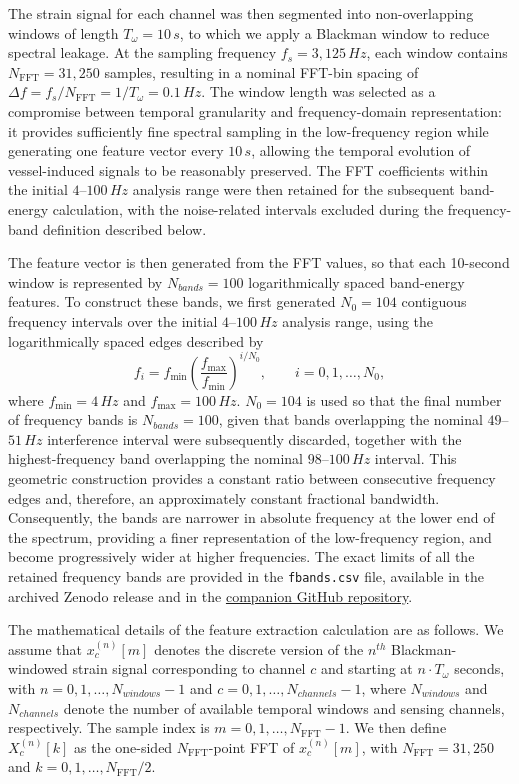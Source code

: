 \documentclass[11pt]{article}
\begin{document}
The strain signal for each channel was then segmented into non-overlapping windows of length $T_\omega=10\,s$, to which we apply a Blackman window to reduce spectral leakage. At the sampling frequency $f_s=3{,}125\,Hz$, each window contains $N_{\mathrm{FFT}}=31{,}250$ samples, resulting in a nominal FFT-bin spacing of
$\Delta f=f_s/N_{\mathrm{FFT}}=1/T_\omega=0.1\,Hz$.
The window length was selected as a compromise between temporal granularity and frequency-domain representation: it provides sufficiently fine spectral sampling in the low-frequency region while generating one feature vector every $10\,s$, allowing the temporal evolution of vessel-induced signals to be reasonably preserved. The FFT coefficients within the initial $4$--$100\,Hz$ analysis range were then retained for the subsequent band-energy calculation, with the noise-related intervals excluded during the frequency-band definition described below.

The feature vector is then generated from the FFT values, so that each 10-second window is represented by $N_{bands}=100$ logarithmically spaced band-energy features. To construct these bands, we first generated $N_0=104$ contiguous frequency intervals over the initial $4$--$100\,Hz$ analysis range, using the logarithmically spaced edges described by
\begin{equation}
  \label{eq:fi}
f_i=f_{\min}
\left(\frac{f_{\max}}{f_{\min}}\right)^{i/N_0},
\qquad i=0,1,\dots,N_0,
\end{equation}
where $f_{\min}=4\,Hz$ and $f_{\max}=100\,Hz$. $N_0=104$ is used so that the final number of frequency bands is  $N_{bands}=100$, given that bands overlapping the nominal $49$--$51\,Hz$ interference interval were subsequently discarded, together with the highest-frequency band overlapping the nominal $98$--$100\,Hz$ interval. This geometric construction provides a constant ratio between consecutive frequency edges and, therefore, an approximately constant fractional bandwidth. Consequently, the bands are narrower in absolute frequency at the lower end of the spectrum, providing a finer representation of the low-frequency region, and become progressively wider at higher frequencies. The exact limits of all the retained frequency bands are provided in the \texttt{fbands.csv} file, available in the archived Zenodo release and in the \href{https://github.com/UAH-PSI/das-vessel-detection/blob/main/data/fbands.csv}{companion GitHub repository}.

The mathematical details of the feature extraction calculation are as follows. We assume that $x_c^{(n)}[m]$ denotes the discrete version of the $n^{th}$ Blackman-windowed strain signal corresponding to channel $c$ and starting at $n\cdot T_\omega$ seconds, with $n=0,1,\dots,N_{windows}-1$ and $c=0,1,\dots,N_{channels}-1$, where $N_{windows}$ and $N_{channels}$ denote the number of available temporal windows and sensing channels, respectively. The sample index is $m=0,1,\dots,N_{\mathrm{FFT}}-1$. We then define $X_c^{(n)}[k]$ as the one-sided $N_{\mathrm{FFT}}$-point FFT of $x_c^{(n)}[m]$, with $N_{\mathrm{FFT}}=31{,}250$ and $k=0,1,\dots,N_{\mathrm{FFT}}/2$.%
\end{document}
